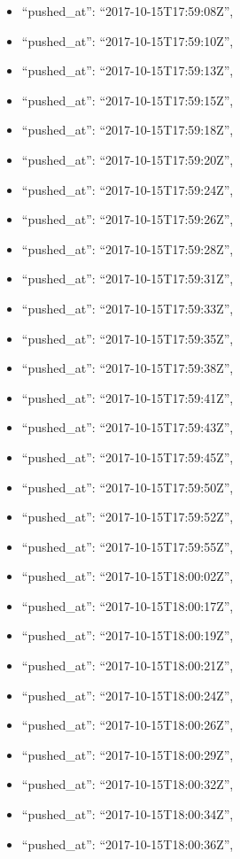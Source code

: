 \begin{itemize}
\item
  ``pushed\_at'': ``2017-10-15T17:59:08Z'',
\item
  ``pushed\_at'': ``2017-10-15T17:59:10Z'',
\item
  ``pushed\_at'': ``2017-10-15T17:59:13Z'',
\item
  ``pushed\_at'': ``2017-10-15T17:59:15Z'',
\item
  ``pushed\_at'': ``2017-10-15T17:59:18Z'',
\item
  ``pushed\_at'': ``2017-10-15T17:59:20Z'',
\item
  ``pushed\_at'': ``2017-10-15T17:59:24Z'',
\item
  ``pushed\_at'': ``2017-10-15T17:59:26Z'',
\item
  ``pushed\_at'': ``2017-10-15T17:59:28Z'',
\item
  ``pushed\_at'': ``2017-10-15T17:59:31Z'',
\item
  ``pushed\_at'': ``2017-10-15T17:59:33Z'',
\item
  ``pushed\_at'': ``2017-10-15T17:59:35Z'',
\item
  ``pushed\_at'': ``2017-10-15T17:59:38Z'',
\item
  ``pushed\_at'': ``2017-10-15T17:59:41Z'',
\item
  ``pushed\_at'': ``2017-10-15T17:59:43Z'',
\item
  ``pushed\_at'': ``2017-10-15T17:59:45Z'',
\item
  ``pushed\_at'': ``2017-10-15T17:59:50Z'',
\item
  ``pushed\_at'': ``2017-10-15T17:59:52Z'',
\item
  ``pushed\_at'': ``2017-10-15T17:59:55Z'',
\item
  ``pushed\_at'': ``2017-10-15T18:00:02Z'',
\item
  ``pushed\_at'': ``2017-10-15T18:00:17Z'',
\item
  ``pushed\_at'': ``2017-10-15T18:00:19Z'',
\item
  ``pushed\_at'': ``2017-10-15T18:00:21Z'',
\item
  ``pushed\_at'': ``2017-10-15T18:00:24Z'',
\item
  ``pushed\_at'': ``2017-10-15T18:00:26Z'',
\item
  ``pushed\_at'': ``2017-10-15T18:00:29Z'',
\item
  ``pushed\_at'': ``2017-10-15T18:00:32Z'',
\item
  ``pushed\_at'': ``2017-10-15T18:00:34Z'',
\item
  ``pushed\_at'': ``2017-10-15T18:00:36Z'',

\end{itemize}
